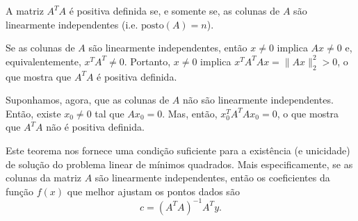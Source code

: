 \begin{teo}
  A matriz $A^TA$ é positiva definida se, e somente se, as colunas de $A$ são linearmente independentes (i.e. $\text{posto}(A)=n$).
\end{teo}
\begin{dem}
  Se as colunas de $A$ são linearmente independentes, então $x\neq 0$ implica $Ax\neq 0$ e, equivalentemente, $x^TA^T\neq 0$. Portanto, $x\neq 0$ implica $x^TA^TAx = \|Ax\|_2^2 > 0$, o que mostra que $A^TA$ é positiva definida.

  Suponhamos, agora, que as colunas de $A$ não são linearmente independentes. Então, existe $x_0\neq 0$ tal que $Ax_0 = 0$. Mas, então, $x_0^TA^TAx_0=0$, o que mostra que $A^TA$ não é positiva definida. 
\end{dem}

Este teorema nos fornece uma condição suficiente para a existência (e unicidade) de solução do problema linear de mínimos quadrados. Mais especificamente, se as colunas da matriz $A$ são linearmente independentes, então os coeficientes da função $f(x)$ que melhor ajustam os pontos dados são
\begin{equation}
  c = (A^TA)^{-1}A^Ty.
\end{equation}

